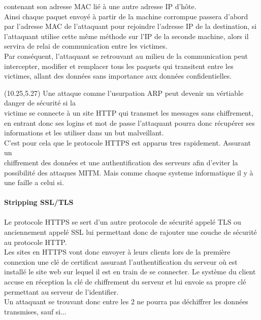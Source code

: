 \documentclass[landscape,12pt]{report}
\begin{document}
\begin{textblock}{5.3}
    contenant son adresse MAC lié à une autre adresse IP d'hôte.\\ 
    Ainsi chaque paquet envoyé à partir de la machine corrompue passera d'abord par l'adresse MAC de l'attaquant pour rejoindre l'adresse IP de la destination, si l'attaquant utilise cette même méthode sur l'IP de la seconde machine, alors il servira de \textcolor{blue!50}{relai}
    de communication entre les victimes.\\
    Par conséquent, l'attaquant se retrouvant au milieu de la communication peut \textcolor{blue!50}{intercepter, modifier et remplacer }
    tous les paquets qui transitent entre les victimes, allant des données sans importance aux données confidentielles.
  \end{textblock}
  \begin{textblock}{5.3}(10.25,5.27)
    Une attaque comme l'usurpation ARP peut devenir un vértiable danger de sécurité si la \\victime se connecte à un site \textcolor{red!70}{HTTP} qui transmet les messages sans chiffrement, en entrant donc ses logins et mot de passe l'attaquant pourra donc récupérer ses informations et les utiliser dans un but malveillant. \\ C'est pour cela que le protocole \textcolor{red!70}{HTTPS} est apparus tres rapidement. Assurant un\\ \textcolor{red!70}{chiffrement des données}
    et une 
    \textcolor{red!70}{authentification}
    des serveurs afin d'eviter la possibilité des attaques MITM.
    Mais comme chaque systeme informatique il y à une faille a celui si.
   \\
   \\
   \textbf{\large Stripping \textcolor{red!70}{SSL/TLS}}
   \\
   \\
   Le protocole \textcolor{red!70}{HTTPS} se sert d'un autre protocole de sécurité appelé TLS ou anciennement appelé SSL lui permettant donc de rajouter une \textcolor{red!70}{couche de sécurité} au protocole HTTP.\\
   Les sites en HTTPS vont donc envoyer à leurs clients lors de la première connexion une \textcolor{red!70}{clé de certificat} assurant l'authentification du serveur où est installé le site web sur lequel il est en train de se connecter. Le système du client accuse en réception la \textcolor{red!70}{clé de chiffrement} du serveur et lui envoie sa propre clé permettant au serveur de l'identifier.\\
   Un attaquant se trouvant donc entre les 2 ne pourra pas \textcolor{red!70}{déchiffrer} les données transmises, sauf si...\\

\end{textblock}
\end{document}
